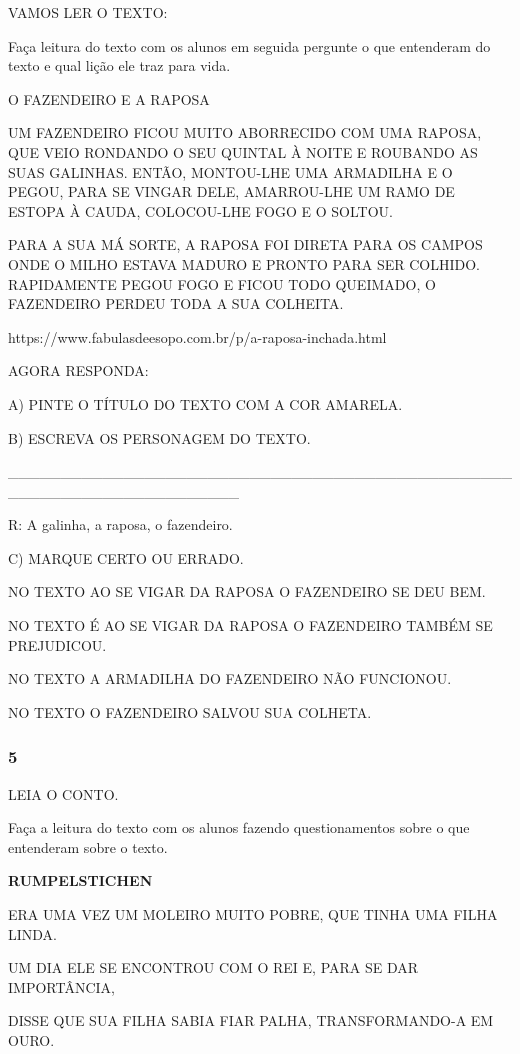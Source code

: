 VAMOS LER O TEXTO:

Faça leitura do texto com os alunos em seguida pergunte o que entenderam
do texto e qual lição ele traz para vida.

O FAZENDEIRO E A RAPOSA

UM FAZENDEIRO FICOU MUITO ABORRECIDO COM UMA RAPOSA, QUE VEIO RONDANDO O
SEU QUINTAL À NOITE E ROUBANDO AS SUAS GALINHAS. ENTÃO, MONTOU-LHE UMA
ARMADILHA E O PEGOU, PARA SE VINGAR DELE, AMARROU-LHE UM RAMO DE ESTOPA
À CAUDA, COLOCOU-LHE FOGO E O SOLTOU.

PARA A SUA MÁ SORTE, A RAPOSA FOI DIRETA PARA OS CAMPOS ONDE O MILHO
ESTAVA MADURO E PRONTO PARA SER COLHIDO. RAPIDAMENTE PEGOU FOGO E FICOU
TODO QUEIMADO, O FAZENDEIRO PERDEU TODA A SUA COLHEITA.

https://www.fabulasdeesopo.com.br/p/a-raposa-inchada.html

AGORA RESPONDA:

A) PINTE O TÍTULO DO TEXTO COM A COR AMARELA.

B) ESCREVA OS PERSONAGEM DO TEXTO.

\_\_\_\_\_\_\_\_\_\_\_\_\_\_\_\_\_\_\_\_\_\_\_\_\_\_\_\_\_\_\_\_\_\_\_\_\_\_\_\_\_\_\_\_\_\_\_\_\_\_\_\_\_\_\_\_\_\_\_\_\_\_\_\_\_\_\_\_\_\_

R: A galinha, a raposa, o fazendeiro.

C) MARQUE CERTO OU ERRADO.

NO TEXTO AO SE VIGAR DA RAPOSA O FAZENDEIRO SE DEU BEM.

NO TEXTO É AO SE VIGAR DA RAPOSA O FAZENDEIRO TAMBÉM SE PREJUDICOU.

NO TEXTO A ARMADILHA DO FAZENDEIRO NÃO FUNCIONOU.

NO TEXTO O FAZENDEIRO SALVOU SUA COLHETA.

\subsubsection{5 }\label{section-59}

LEIA O CONTO.

Faça a leitura do texto com os alunos fazendo questionamentos sobre o
que entenderam sobre o texto.

\textbf{RUMPELSTICHEN}

ERA UMA VEZ UM MOLEIRO MUITO POBRE, QUE TINHA UMA FILHA LINDA.

UM DIA ELE SE ENCONTROU COM O REI E, PARA SE DAR IMPORTÂNCIA,

DISSE QUE SUA FILHA SABIA FIAR PALHA, TRANSFORMANDO-A EM OURO.

